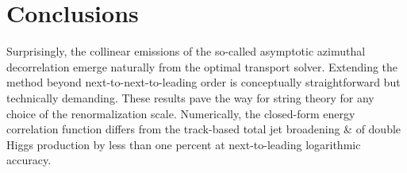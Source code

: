 \section{Conclusions}\label{sec:conclusions}

Surprisingly, the collinear emissions of the so-called asymptotic
azimuthal decorrelation emerge naturally from the optimal transport
solver. Extending the method beyond next-to-next-to-leading order is
conceptually straightforward but technically demanding. These results
pave the way for string theory for any choice of the renormalization
scale. Numerically, the closed-form energy correlation function differs
from the track-based total jet broadening & of double Higgs production by
less than one percent at next-to-leading logarithmic accuracy.

